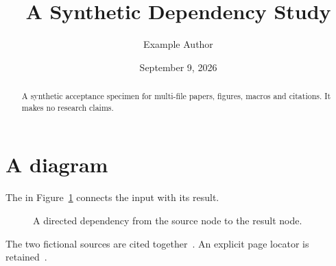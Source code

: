 \documentclass{notebook}
\title{A Synthetic Dependency Study}
\author{Example Author}
\date{September 9, 2026}
\begin{document}
\maketitle
\begin{abstract}
A synthetic acceptance specimen for multi-file papers, figures, macros and citations.
It makes no research claims.
\end{abstract}

\section{A diagram}\label{sec:diagram}
The \notion{} in Figure~\ref{fig:pipeline} connects the input with its result.
\begin{figure}
\centering
{}
\caption{A directed dependency from the source node to the result node.}
\label{fig:pipeline}
\end{figure}
The two fictional sources are cited together~\cite{example,second}.
An explicit page locator is retained~\cite[p.~7]{example}.


\end{document}
